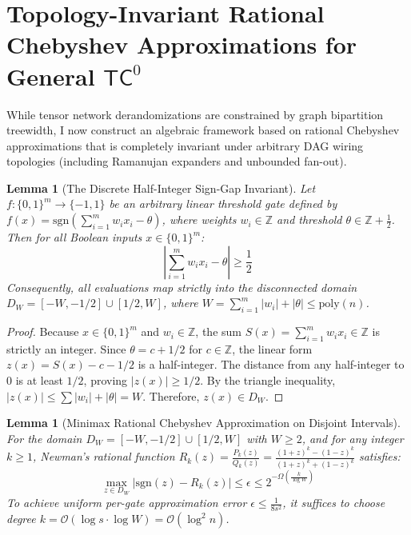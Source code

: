 \documentclass[11pt,a4paper]{article}
\newtheorem{lemma}[theorem]{Lemma}
\theoremstyle{definition}
\theoremstyle{remark}
\newcommand{\TC}{\mathsf{TC}}
\newcommand{\poly}{\mathrm{poly}}
\begin{document}
\section{Topology-Invariant Rational Chebyshev Approximations for General $\TC^0$}\label{sec:chebyshev_tc0}

While tensor network derandomizations are constrained by graph bipartition treewidth, I now construct an algebraic framework based on rational Chebyshev approximations that is completely invariant under arbitrary DAG wiring topologies (including Ramanujan expanders and unbounded fan-out).

\begin{lemma}[The Discrete Half-Integer Sign-Gap Invariant]\label{lem:sign_gap}
Let $f : \{0,1\}^m \to \{-1, 1\}$ be an arbitrary linear threshold gate defined by $f(x) = \mathrm{sgn}\left(\sum_{i=1}^m w_i x_i - \theta\right)$, where weights $w_i \in \mathbb{Z}$ and threshold $\theta \in \mathbb{Z} + \frac{1}{2}$. Then for all Boolean inputs $x \in \{0,1\}^m$:
\[
\left| \sum_{i=1}^m w_i x_i - \theta \right| \ge \frac{1}{2}
\]
Consequently, all evaluations map strictly into the disconnected domain $D_W = [-W, -1/2] \cup [1/2, W]$, where $W = \sum_{i=1}^m |w_i| + |\theta| \le \poly(n)$.
\end{lemma}

\begin{proof}
Because $x \in \{0,1\}^m$ and $w_i \in \mathbb{Z}$, the sum $S(x) = \sum_{i=1}^m w_i x_i \in \mathbb{Z}$ is strictly an integer. Since $\theta = c + 1/2$ for $c \in \mathbb{Z}$, the linear form $z(x) = S(x) - c - 1/2$ is a half-integer. The distance from any half-integer to 0 is at least $1/2$, proving $|z(x)| \ge 1/2$. By the triangle inequality, $|z(x)| \le \sum |w_i| + |\theta| = W$. Therefore, $z(x) \in D_W$.
\end{proof}

\begin{lemma}[Minimax Rational Chebyshev Approximation on Disjoint Intervals]\label{lem:chebyshev_approx}
For the domain $D_W = [-W, -1/2] \cup [1/2, W]$ with $W \ge 2$, and for any integer $k \ge 1$, Newman's rational function $R_k(z) = \frac{P_k(z)}{Q_k(z)} = \frac{(1+z)^k - (1-z)^k}{(1+z)^k + (1-z)^k}$ satisfies:
\[
\max_{z \in D_W} |\mathrm{sgn}(z) - R_k(z)| \le \epsilon \le 2^{-\Omega\left(\frac{k}{\log W}\right)}
\]
To achieve uniform per-gate approximation error $\epsilon \le \frac{1}{8s^2}$, it suffices to choose degree $k = \mathcal{O}(\log s \cdot \log W) = \mathcal{O}(\log^2 n)$.
\end{lemma}
\end{document}
